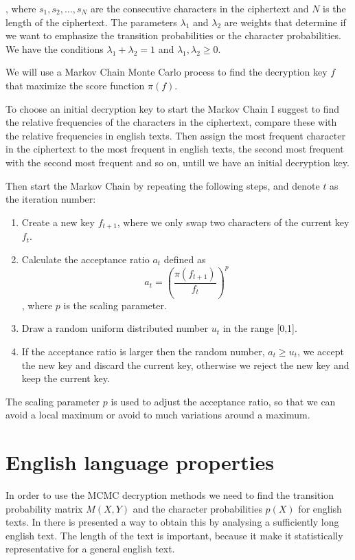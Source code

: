 \documentclass[a4paper, 11pt]{article}
\begin{document}
, where $s_1,s_2,\dots,s_N$ are the consecutive characters in the ciphertext
and $N$ is the length of the ciphertext. The parameters $\lambda_1$ and 
$\lambda_2$ are weights that determine if we want to emphasize the
transition probabilities or the character probabilities. We have the conditions
$\lambda_1 + \lambda_2 = 1$ and $\lambda_1, \lambda_2 \geq 0$.

We will use a Markov Chain Monte Carlo process to find the decryption key
$f$ that maximize the score function $\pi(f)$.

To choose an initial decryption key to start the Markov Chain I suggest to
find the relative frequencies of the characters in the ciphertext, compare 
these with the relative frequencies in english texts. Then assign the most
frequent character in the ciphertext to the most frequent in english texts, 
the second most frequent with the second most frequent and so on, untill
we have an initial decryption key.

Then start the Markov Chain by repeating the following steps, and denote
$t$ as the iteration number:

\begin{enumerate}
  \item Create a new key $f_{t+1}$, where we only swap two characters of 
  the current key $f_t$.

  \item Calculate the acceptance ratio $a_t$ defined as
  \[
    a_t = \left( \frac{\pi(f_{t+1})}{f_{t}} \right)^p
  \]
  , where $p$ is the scaling parameter.

  \item Draw a random uniform distributed number $u_t$ in the range [0,1].

  \item If the acceptance ratio is larger then the random number, 
  $a_t \geq u_t$, we accept the new key and discard the current key, 
  otherwise we reject the new key and keep the current key.
\end{enumerate}

The scaling parameter $p$ is used to adjust the acceptance ratio, so that
we can avoid a local maximum or avoid to much variations around a maximum.


\section{English language properties}

In order to use the MCMC decryption methods we need to find the transition
probability matrix $M(X,Y)$ and the character probabilities $p(X)$ for
english texts. In \cite{Landgraf} there is presented a way to obtain this by
analysing a sufficiently long english text. The length of the text is
important, because it make it statistically representative for a general
english text. 
\end{document}
